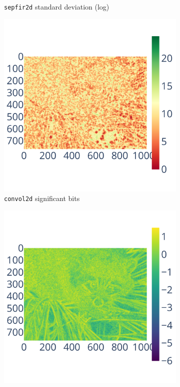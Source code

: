 \begin{figure}
\begin{subfigure}{0.3\linewidth}
        \caption{\centering\texttt{sepfir2d} standard deviation (log)}
        \label{fig:bspline_bisplev_std}
    \end{subfigure}
    \begin{subfigure}{0.3\linewidth}
        \includegraphics[width=\linewidth]{figure/bspline/convol2d_sig.pdf}
        \caption{\centering\texttt{convol2d} significant bits}
        \label{fig:bspline_convol2d_sig}
    \end{subfigure}
    \begin{subfigure}{0.3\linewidth}
        \includegraphics[width=\linewidth]{figure/bspline/convol2d_mean_log.pdf}

\end{subfigure}
\end{figure}
